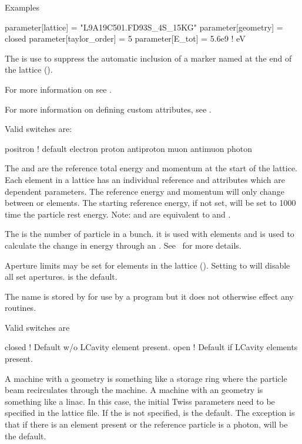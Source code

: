 \noindent
Examples
\begin{example}
  parameter[lattice]      = "L9A19C501.FD93S_4S_15KG"
  parameter[geometry]     = closed
  parameter[taylor_order] = 5
  parameter[E_tot]        = 5.6e9    ! eV
\end{example}

The  is use to suppress the automatic inclusion
of a marker named  at the end of the lattice (). 

For more information on  see .

For more information on defining custom attributes, see .

Valid  switches are:
\begin{example}
  positron  ! default
  electron
  proton
  antiproton
  muon
  antimuon
  photon
\end{example}

The  and  are the reference
total energy and momentum at the start of the lattice. Each element
in a lattice has an individual reference  and  attributes
which are dependent parameters. The reference energy and momentum will only
change between  or  elements. The starting
reference energy, if not set, will be set to 1000 time the particle
rest energy.  Note:  and  are
equivalent to  and .

The  is the number of particle in a bunch.
it is used with  elements and is used to calculate the
change in energy through an . See~ for more
details.

Aperture limits may be set for elements in the lattice
(). Setting  to  will
disable all set apertures.  is the default.

The  name is stored by \bmad for use by a program but it does
not otherwise effect any \bmad routines. 

\noindent
{}
Valid  switches are
\begin{example}
  closed  ! Default w/o LCavity element present.
  open    ! Default if LCavity elements present.
\end{example}
A machine with a  geometry is something like a storage ring
where the particle beam recirculates through the machine.  A machine
with an  geometry is something like a linac.  In this case,
the initial Twiss parameters need to be specified in the lattice
file. If the  is not specified,  is the
default. The exception is that if there is an  element
present or the reference particle is a photon,  will be the
default.


